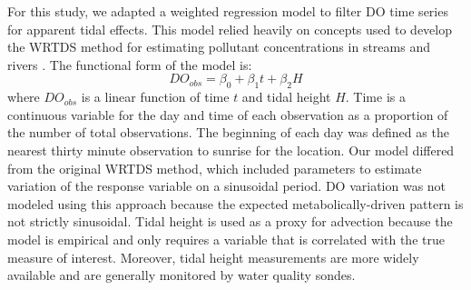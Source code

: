 \documentclass[letterpaper,12pt,oneside]{article}\usepackage[]{graphicx}\usepackage[]{color}
\begin{document}
For this study, we adapted a weighted regression model to filter \ac{DO} time series for apparent tidal effects.  This model relied heavily on concepts used to develop the \ac{WRTDS} method for estimating pollutant concentrations in streams and rivers \citep{Hirsch10}.  The functional form of the model is:
\begin{equation}\label{funform}
DO_{obs}= \beta_0 + \beta_1 t + \beta_2 H
\end{equation}
where $DO_{obs}$ is a linear function of time $t$ and tidal height $H$.  Time is a continuous variable for the day and time of each observation as a proportion of the number of total observations.  The beginning of each day was defined as the nearest thirty minute observation to sunrise for the location.  Our model differed from the original \ac{WRTDS} method, which included parameters to estimate variation of the response variable on a sinusoidal period.  \ac{DO} variation was not modeled using this approach because the expected metabolically-driven pattern is not strictly sinusoidal.  Tidal height is used as a proxy for advection because the model is empirical and only requires a variable that is correlated with the true measure of interest.  Moreover, tidal height measurements are more widely available and are generally monitored by water quality sondes.
\end{document}
